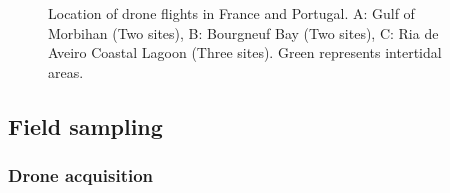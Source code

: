 \documentclass[
  number]{elsarticle}
\begin{document}
\label{cell-fig-map}
\begin{figure}[H]


\caption{\label{fig-map}Location of drone flights in France and
Portugal. A: Gulf of Morbihan (Two sites), B: Bourgneuf Bay (Two sites),
C: Ria de Aveiro Coastal Lagoon (Three sites). Green represents
intertidal areas.}

\end{figure}%

\subsection{Field sampling}\label{field-sampling}

\subsubsection{Drone acquisition}\label{drone-acquisition}
\end{document}
